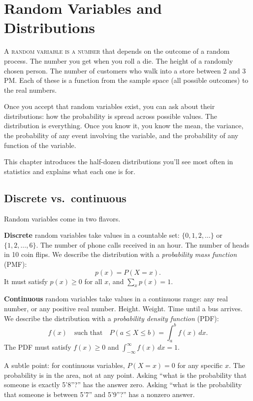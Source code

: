 \chapter{Random Variables and Distributions}
\label{ch:distributions}

\noindent\textsc{A random variable is a number} that depends on the outcome of a random process. The number you get when you roll a die. The height of a randomly chosen person. The number of customers who walk into a store between 2 and 3 PM. Each of these is a function from the sample space (all possible outcomes) to the real numbers.

Once you accept that random variables exist, you can ask about their distributions: how the probability is spread across possible values. The distribution is everything. Once you know it, you know the mean, the variance, the probability of any event involving the variable, and the probability of any function of the variable.

This chapter introduces the half-dozen distributions you'll see most often in statistics and explains what each one is for.

\section{Discrete vs.\ continuous}

Random variables come in two flavors.

\textbf{Discrete} random variables take values in a countable set: $\{0, 1, 2, \ldots\}$ or $\{1, 2, \ldots, 6\}$. The number of phone calls received in an hour. The number of heads in 10 coin flips. We describe the distribution with a \emph{probability mass function} (PMF):
\[
  p(x) = P(X = x).
\]
It must satisfy $p(x) \geq 0$ for all $x$, and $\sum_x p(x) = 1$.

\textbf{Continuous} random variables take values in a continuous range: any real number, or any positive real number. Height. Weight. Time until a bus arrives. We describe the distribution with a \emph{probability density function} (PDF):
\[
  f(x) \quad \text{such that} \quad P(a \leq X \leq b) = \int_a^b f(x)\,dx.
\]
The PDF must satisfy $f(x) \geq 0$ and $\int_{-\infty}^{\infty} f(x)\,dx = 1$.

A subtle point: for continuous variables, $P(X = x) = 0$ for any specific $x$. The probability is in the area, not at any point. Asking ``what is the probability that someone is exactly 5'8\hspace{1pt}''?'' has the answer zero. Asking ``what is the probability that someone is between 5'7\hspace{1pt}'' and 5'9\hspace{1pt}''?'' has a nonzero answer.

